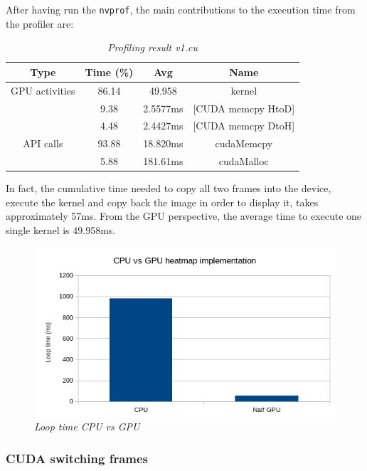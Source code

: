 \documentclass[paper=a4, fontsize=10pt]{scrartcl}	%
\begin{document}
	After having run the \texttt{nvprof}, the main contributions to the execution time from the profiler are:
	\begin{table}[H]
		\centering
			\begin{center}
			\begin{tabular}{ |c|c|c|c| } 
				\hline
				\textbf{Type} & \textbf{Time} (\%) & \textbf{Avg} & \textbf{Name} \\ 
				\hline
				GPU activities & 86.14 & 49.958 & kernel \\ 
				& 9.38 & 2.5577ms & [CUDA memcpy HtoD] \\ 
				& 4.48 & 2.4427ms & [CUDA memcpy DtoH] \\ 
				\hline
				API calls & 93.88 & 18.820ms & cudaMemcpy \\ 
				& 5.88 & 181.61ms & cudaMalloc \\ 
				\hline
			\end{tabular}
		\end{center}
		\label{fig:table_v1}
		\caption{\textit{Profiling result v1.cu}}
	\end{table}
	In fact, the cumulative time needed to copy all two frames into the device, execute the kernel and copy back the image in order to display it, takes approximately 57ms. From the GPU perspective, the average time to execute one single kernel is 49.958ms.
	
	
	
	\begin{figure}[H]
		\centering
		\begin{center}
			\includegraphics[width=0.6\linewidth]{images/heatmap/gpu_naif}
		\end{center}
	\label{fig:cpu_vs_gpu}
	\caption{\textit{Loop time CPU vs GPU}}
	\end{figure}
	
	\subsubsection{CUDA switching frames}
	
\end{document}
